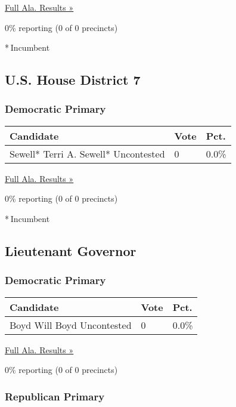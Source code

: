 \href{https://www.nytimes3xbfgragh.onion/elections/results/alabama}{Full
Ala. Results »}

0\% reporting (0 of 0 precincts)

* Incumbent

\hypertarget{us-house-district-7}{%
\subsection{U.S. House District 7}\label{us-house-district-7}}

\hypertarget{democratic-primary-7}{%
\subsubsection{Democratic Primary}\label{democratic-primary-7}}

\begin{longtable}[]{@{}lll@{}}
\toprule
Candidate & Vote & Pct.\tabularnewline
\midrule
\endhead
 Sewell* Terri A. Sewell* Uncontested & 0 & 0.0\%\tabularnewline
\bottomrule
\end{longtable}

\href{https://www.nytimes3xbfgragh.onion/elections/results/alabama}{Full
Ala. Results »}

0\% reporting (0 of 0 precincts)

* Incumbent

\hypertarget{lieutenant-governor}{%
\subsection{Lieutenant Governor}\label{lieutenant-governor}}

\hypertarget{democratic-primary-8}{%
\subsubsection{Democratic Primary}\label{democratic-primary-8}}

\begin{longtable}[]{@{}lll@{}}
\toprule
Candidate & Vote & Pct.\tabularnewline
\midrule
\endhead
 Boyd Will Boyd Uncontested & 0 & 0.0\%\tabularnewline
\bottomrule
\end{longtable}

\href{https://www.nytimes3xbfgragh.onion/elections/results/alabama}{Full
Ala. Results »}

0\% reporting (0 of 0 precincts)

\hypertarget{republican-primary-7}{%
\subsubsection{Republican Primary}\label{republican-primary-7}}


